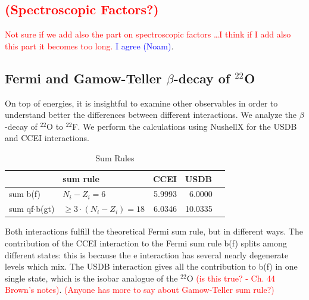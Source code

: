 \documentclass[12pt,a4paper]{article}
\begin{document}
%
\subsection{\textcolor{red}{(Spectroscopic Factors?)}}
\textcolor{red}{Not sure if we add also the part on spectroscopic factors \dots I think if I add also this part it becomes too long.} \textcolor{blue}{I agree (Noam)}. 
%

%
\subsection{Fermi and Gamow-Teller $\beta$-decay of $^{22}$O}
%
On top of energies, it is insightful to examine other observables in order to understand better the differences between different interactions. We analyze the $\beta$-decay of $^{22}$O to $^{22}$F.
We perform the calculations using NushellX for the USDB  and CCEI interactions. 
\begin{table}[h!]
\caption{Sum Rules}
\begin{center}
\begin{tabular}{l@{\qquad}l@{\qquad}r@{\qquad}rl}
\hline
\multicolumn{1}{l}{\rule{0pt}{12pt}
                   }&\multicolumn{1}{l}{\rule{0pt}{12pt} sum rule}&\multicolumn{1}{l}{CCEI}&\multicolumn{2}{l}{USDB}\\[2pt]
\hline\rule{0pt}{12pt}
sum b(f)            &  $N_i-Z_i=6$   & 5.9993 & 6.0000 &\\
sum qf$\cdot$b(gt)  &  $\ge 3\cdot(N_i-Z_i)=18$  & 6.0346 & 10.0335 &\\[2pt]
\hline
\end{tabular}
\end{center}
\end{table}

Both interactions fulfill the theoretical Fermi sum rule, but in different ways.
The contribution of the CCEI interaction to the Fermi sum rule b(f) splits among different states: this is because the e interaction has several nearly degenerate levels which mix. The USDB interaction gives all the contribution to b(f) in one single state, which is the isobar analogue of the $^{22}$O \textcolor{red}{(is this true? - Ch. 44 Brown's notes)}. 
\textcolor{red}{(Anyone has more to say about Gamow-Teller sum rule?)}
\end{document}
